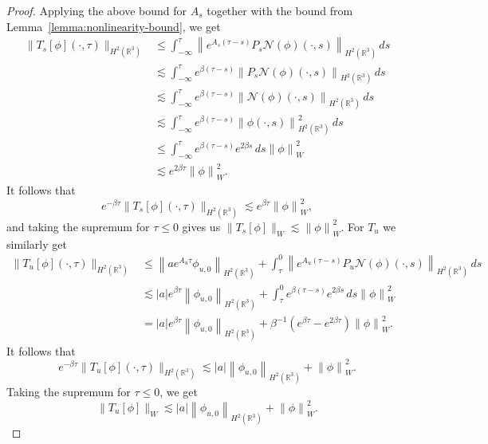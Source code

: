 \documentclass[11pt]{article}
\begin{document}
\begin{proof}
  Applying the above bound for \(A_{s}\) together with the bound from
  Lemma~\ref{lemma:nonlinearity-bound}, we get
  \begin{align*}
    \|T_{s}[\phi](\cdot, \tau)\|_{H^{2}(\mathbb{R}^{3})}
    &\leq \int_{-\infty}^{\tau} \left\|e^{A_{s}(\tau - s)}P_{s}\mathcal{N}(\phi)(\cdot, s)\right\|_{H^{2}(\mathbb{R}^{3})}\,ds\\
    &\lesssim \int_{-\infty}^{\tau} e^{\beta(\tau - s)}\left\|P_{s}\mathcal{N}(\phi)(\cdot, s)\right\|_{H^{2}(\mathbb{R}^{3})}\,ds\\
    &\lesssim \int_{-\infty}^{\tau} e^{\beta(\tau - s)}\left\|\mathcal{N}(\phi)(\cdot, s)\right\|_{H^{2}(\mathbb{R}^{3})}\,ds\\
    &\lesssim \int_{-\infty}^{\tau} e^{\beta(\tau - s)}\left\|\phi(\cdot, s)\right\|_{H^{2}(\mathbb{R}^{3})}^{2}\,ds\\
    &\leq \int_{-\infty}^{\tau} e^{\beta(\tau - s)}e^{2\beta s}\,ds \left\|\phi\right\|_{W}^{2}\\
    &\lesssim e^{2\beta \tau}\left\|\phi\right\|_{W}^{2}.
  \end{align*}
  It follows that
  \begin{equation*}
    e^{-\beta\tau}\|T_{s}[\phi](\cdot, \tau)\|_{H^{2}(\mathbb{R}^{3})}
    \lesssim e^{\beta \tau}\left\|\phi\right\|_{W}^{2},
  \end{equation*}
  and taking the supremum for \(\tau \leq 0\) gives us
  \(\|T_{s}[\phi]\|_{W} \lesssim \left\|\phi\right\|_{W}^{2}\). For
  \(T_{u}\) we similarly get
  \begin{align*}
    \|T_{u}[\phi](\cdot, \tau)\|_{H^{2}(\mathbb{R}^{3})}
    &\leq \left\|ae^{A_{u}\tau}\phi_{u,0}\right\|_{H^{2}(\mathbb{R}^{3})}
      + \int_{\tau}^{0} \left\|e^{A_{u}(\tau - s)}P_{u}\mathcal{N}(\phi)(\cdot, s)\right\|_{H^{2}(\mathbb{R}^{3})}\,ds\\
    &\lesssim |a|e^{\beta\tau}\left\|\phi_{u,0}\right\|_{H^{2}(\mathbb{R}^{3})}
      + \int_{\tau}^{0} e^{\beta(\tau - s)}e^{2\beta s}\,ds\left\|\phi\right\|_{W}^{2}\\
    &= |a|e^{\beta\tau}\left\|\phi_{u,0}\right\|_{H^{2}(\mathbb{R}^{3})}
      + \beta^{-1}\left(
      e^{\beta\tau}
      - e^{2\beta\tau}
      \right)\left\|\phi\right\|_{W}^{2}.
  \end{align*}
  It follows that
  \begin{equation*}
    e^{-\beta\tau}\|T_{u}[\phi](\cdot, \tau)\|_{H^{2}(\mathbb{R}^{3})}
    \lesssim |a|\left\|\phi_{u,0}\right\|_{H^{2}(\mathbb{R}^{3})}
    + \left\|\phi\right\|_{W}^{2}.
  \end{equation*}
  Taking the supremum for \(\tau \leq 0\), we get
  \begin{equation*}
    \|T_{u}[\phi]\|_{W} \lesssim |a|\left\|\phi_{u,0}\right\|_{H^{2}(\mathbb{R}^{3})} + \left\|\phi\right\|_{W}^{2}.
  \end{equation*}


\end{proof}
\end{document}
